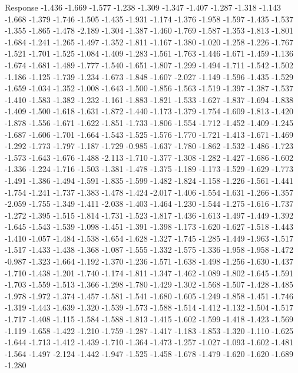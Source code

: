 \documentclass[9pt]{article}
\theoremstyle{plain}
\theoremstyle{definition}
\theoremstyle{remark}
\numberwithin{equation}{section}
\begin{document}
Response
-1.436
-1.669
-1.577
-1.238
-1.309
-1.347
-1.407
-1.287
-1.318
-1.143
-1.668
-1.379
-1.746
-1.505
-1.435
-1.931
-1.174
-1.376
-1.958
-1.597
-1.435
-1.537
-1.355
-1.865
-1.478
-2.189
-1.304
-1.387
-1.460
-1.769
-1.587
-1.353
-1.813
-1.801
-1.684
-1.241
-1.265
-1.497
-1.352
-1.811
-1.167
-1.380
-1.020
-1.258
-1.226
-1.767
-1.521
-1.701
-1.525
-1.084
-1.409
-1.283
-1.561
-1.763
-1.446
-1.671
-1.459
-1.136
-1.674
-1.681
-1.489
-1.777
-1.540
-1.651
-1.807
-1.299
-1.494
-1.711
-1.542
-1.502
-1.186
-1.125
-1.739
-1.234
-1.673
-1.848
-1.607
-2.027
-1.149
-1.596
-1.435
-1.529
-1.659
-1.034
-1.352
-1.008
-1.643
-1.500
-1.856
-1.563
-1.519
-1.397
-1.387
-1.537
-1.410
-1.583
-1.382
-1.232
-1.161
-1.883
-1.821
-1.533
-1.627
-1.837
-1.694
-1.838
-1.409
-1.500
-1.618
-1.631
-1.872
-1.440
-1.173
-1.379
-1.754
-1.609
-1.813
-1.420
-1.878
-1.556
-1.671
-1.622
-1.851
-1.733
-1.806
-1.554
-1.712
-1.452
-1.409
-1.245
-1.687
-1.606
-1.701
-1.664
-1.543
-1.525
-1.576
-1.770
-1.721
-1.413
-1.671
-1.469
-1.292
-1.773
-1.797
-1.187
-1.729
-0.985
-1.637
-1.780
-1.862
-1.532
-1.486
-1.723
-1.573
-1.643
-1.676
-1.488
-2.113
-1.710
-1.377
-1.308
-1.282
-1.427
-1.686
-1.602
-1.336
-1.224
-1.716
-1.503
-1.381
-1.478
-1.375
-1.189
-1.173
-1.529
-1.629
-1.773
-1.491
-1.386
-1.494
-1.591
-1.835
-1.599
-1.482
-1.824
-1.158
-1.226
-1.561
-1.441
-1.754
-1.241
-1.737
-1.383
-1.478
-1.424
-2.017
-1.406
-1.554
-1.631
-1.266
-1.357
-2.059
-1.755
-1.349
-1.411
-2.038
-1.403
-1.464
-1.230
-1.544
-1.275
-1.616
-1.737
-1.272
-1.395
-1.515
-1.814
-1.731
-1.523
-1.817
-1.436
-1.613
-1.497
-1.449
-1.392
-1.645
-1.543
-1.539
-1.098
-1.451
-1.391
-1.398
-1.173
-1.620
-1.627
-1.518
-1.443
-1.410
-1.057
-1.484
-1.538
-1.654
-1.628
-1.327
-1.745
-1.285
-1.449
-1.963
-1.517
-1.517
-1.433
-1.438
-1.368
-1.087
-1.555
-1.332
-1.575
-1.336
-1.958
-1.958
-1.472
-0.987
-1.323
-1.664
-1.192
-1.370
-1.236
-1.571
-1.638
-1.498
-1.256
-1.630
-1.437
-1.710
-1.438
-1.201
-1.740
-1.174
-1.811
-1.347
-1.462
-1.089
-1.802
-1.645
-1.591
-1.703
-1.559
-1.513
-1.366
-1.298
-1.780
-1.429
-1.302
-1.568
-1.507
-1.428
-1.485
-1.978
-1.972
-1.374
-1.457
-1.581
-1.541
-1.680
-1.605
-1.249
-1.858
-1.451
-1.746
-1.319
-1.443
-1.639
-1.320
-1.539
-1.573
-1.588
-1.514
-1.412
-1.132
-1.504
-1.517
-1.717
-1.408
-1.115
-1.584
-1.588
-1.813
-1.415
-1.602
-1.599
-1.418
-1.423
-1.569
-1.119
-1.658
-1.422
-1.210
-1.759
-1.287
-1.417
-1.183
-1.853
-1.320
-1.110
-1.625
-1.644
-1.713
-1.412
-1.439
-1.710
-1.364
-1.473
-1.257
-1.027
-1.093
-1.602
-1.481
-1.564
-1.497
-2.124
-1.442
-1.947
-1.525
-1.458
-1.678
-1.479
-1.620
-1.620
-1.689
-1.280
\end{document}
